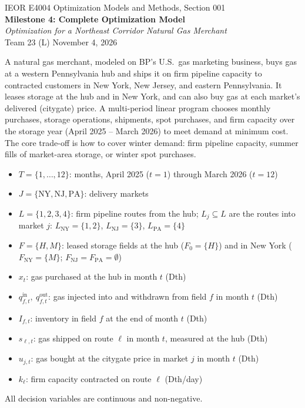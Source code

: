 \documentclass[11pt]{article}
\newcommand{\head}[1]{\needspace{5\baselineskip}\vspace{0.5em}\noindent{\large\bfseries\color{navy}\uline{#1}}\par\vspace{0.15em}}
\begin{document}
\begin{center}
  {\large IEOR E4004 Optimization Models and Methods, Section 001}\\[0.2em]
  {\Large\bfseries\color{navy} Milestone 4: Complete Optimization Model}\\[0.2em]
  {\itshape Optimization for a Northeast Corridor Natural Gas Merchant}\\[0.2em]
  Team 23 (L) \quad\textbullet\quad November 4, 2026
\end{center}

\head{Summary}
A natural gas merchant, modeled on BP's U.S.\ gas marketing business, buys gas at a western
Pennsylvania hub and ships it on firm pipeline capacity to contracted customers in New York, New
Jersey, and eastern Pennsylvania. It leases storage at the hub and in New York, and can also buy gas
at each market's delivered (citygate) price. A multi-period linear program chooses monthly purchases,
storage operations, shipments, spot purchases, and firm capacity over the storage year (April 2025 --
March 2026) to meet demand at minimum cost. The core trade-off is how to cover winter demand: firm
pipeline capacity, summer fills of market-area storage, or winter spot purchases.

\head{Sets}
\vspace{-0.4\baselineskip}
\begin{itemize}[leftmargin=1cm, noitemsep, label=--]
  \item $T = \{1,\dots,12\}$: months, April 2025 ($t=1$) through March 2026 ($t=12$)
  \item $J = \{\mathrm{NY}, \mathrm{NJ}, \mathrm{PA}\}$: delivery markets
  \item $L = \{1,2,3,4\}$: firm pipeline routes from the hub; $L_j \subseteq L$ are the routes into
        market $j$: $L_{\mathrm{NY}} = \{1,2\}$, $L_{\mathrm{NJ}} = \{3\}$, $L_{\mathrm{PA}} = \{4\}$
  \item $F = \{H, M\}$: leased storage fields at the hub ($F_0 = \{H\}$) and in New York
        ($F_{\mathrm{NY}} = \{M\}$; $F_{\mathrm{NJ}} = F_{\mathrm{PA}} = \emptyset$)
\end{itemize}

\head{Decision Variables}
\vspace{-0.4\baselineskip}
\begin{itemize}[leftmargin=1cm, noitemsep, label=--]
  \item $x_t$: gas purchased at the hub in month $t$ (Dth)
  \item $q^{\mathrm{in}}_{f,t},\ q^{\mathrm{out}}_{f,t}$: gas injected into and withdrawn from field $f$ in month $t$ (Dth)
  \item $I_{f,t}$: inventory in field $f$ at the end of month $t$ (Dth)
  \item $s_{\ell,t}$: gas shipped on route $\ell$ in month $t$, measured at the hub (Dth)
  \item $u_{j,t}$: gas bought at the citygate price in market $j$ in month $t$ (Dth)
  \item $k_\ell$: firm capacity contracted on route $\ell$ (Dth/day)
\end{itemize}
All decision variables are continuous and non-negative.
\end{document}
